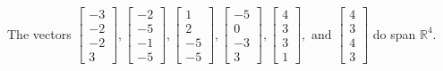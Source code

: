 \begin{exercise}
\begin{exerciseStatement}
  \end{exerciseStatement}
  \begin{exerciseAnswer}
   The vectors \(\left[\begin{array}{r}
-3 \\
-2 \\
-2 \\
3
\end{array}\right] , \left[\begin{array}{r}
-2 \\
-5 \\
-1 \\
-5
\end{array}\right] , \left[\begin{array}{r}
1 \\
2 \\
-5 \\
-5
\end{array}\right] , \left[\begin{array}{r}
-5 \\
0 \\
-3 \\
3
\end{array}\right] , \left[\begin{array}{r}
4 \\
3 \\
3 \\
1
\end{array}\right] , \text{ and } \left[\begin{array}{r}
4 \\
3 \\
4 \\
3
\end{array}\right]\) 
  	 do  
	span \(\mathbb{R}^4\).
  


  \end{exerciseAnswer}
\end{exercise}